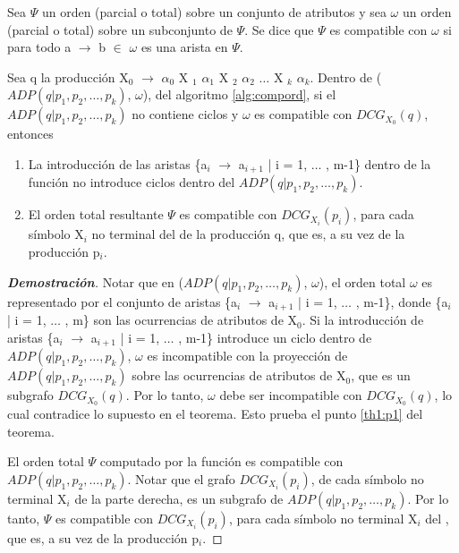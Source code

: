 \begin{definition}
Sea $\Psi$ un orden (parcial o total) sobre un conjunto de atributos y sea $\omega$ un orden (parcial o total) sobre un subconjunto de $\Psi$. Se dice que $\Psi$ es compatible con $\omega$ si para todo a $\rightarrow$ b $\in$ $\omega$ es una arista en $\Psi$.
\end{definition}


\begin{theorem}
\label{th1}
Sea q la producción X$_{0}$ $\rightarrow$ $\alpha_{0}$ X $_{1}$ $\alpha_{1}$ X $_{2}$ $\alpha_{2}$ $\ldots$ X $_{k}$ $\alpha_{k}$. Dentro de ($ADP (q | p_{1}, p_{2}, \dots, p_{k})$, $\omega$), del algoritmo \ref{alg:compord}, si el $ADP (q | p_{1}, p_{2}, \dots, p_{k})$ no contiene ciclos y $\omega$ es compatible con $DCG_{X_{0}}(q)$, entonces

\begin{enumerate}
    \item \label{th1:p1}La introducción de las aristas \{a$_{i}$ $\rightarrow$ a$_{i+1}$ | i = 1, $\ldots$ , m-1\} dentro de la función  no introduce ciclos dentro del $ADP (q | p_{1}, p_{2}, \dots, p_{k})$.
 
    \item \label{th1:p2}El orden total resultante $\Psi$ es compatible con $DCG_{X_{i}}(p_{i})$, para cada símbolo X$_{i}$ no terminal del  de la producción q, que es, a su vez  de la producción p$_{i}$.
\end{enumerate}

\end{theorem}

\begin{proof}[\textbf{Demostración}]

Notar que en ($ADP (q | p_{1}, p_{2}, \dots, p_{k})$, $\omega$), el orden total $\omega$ es representado por el conjunto de aristas \{a$_{i}$ $\rightarrow$ a$_{i+1}$ | i = 1, $\ldots$ , m-1\}, donde \{a$_{i}$ | i = 1, $\ldots$ , m\} son las ocurrencias de atributos de X$_{0}$. Si la introducción de aristas \{a$_{i}$ $\rightarrow$ a$_{i+1}$ | i = 1, $\ldots$ , m-1\} introduce un ciclo dentro de $ADP (q | p_{1}, p_{2}, \dots, p_{k})$, $\omega$ es incompatible con la proyección de $ADP (q | p_{1}, p_{2}, \dots, p_{k})$ sobre las ocurrencias de atributos de X$_{0}$, que es un subgrafo $DCG_{X_{0}}(q)$. Por lo tanto, $\omega$ debe ser incompatible con $DCG_{X_{0}}(q)$, lo cual contradice lo supuesto en el teorema. Esto prueba el punto \ref{th1:p1} del teorema.

El orden total $\Psi$ computado por la función  es compatible con $ADP (q | p_{1}, p_{2}, \dots, p_{k})$. Notar que el grafo $DCG_{X_{i}}(p_{i})$, de cada símbolo no terminal X$_{i}$ de la parte derecha, es un subgrafo de $ADP (q | p_{1}, p_{2}, \dots, p_{k})$. Por lo tanto, $\Psi$ es compatible con $DCG_{X_{i}}(p_{i})$, para cada símbolo no terminal X$_{i}$ del , que es, a su vez  de la producción p$_{i}$.

\end{proof}


